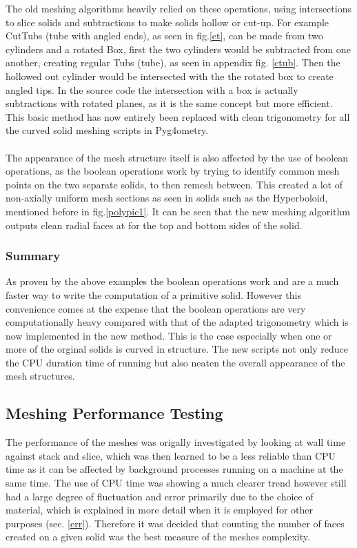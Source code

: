 \documentclass[12pt,a4paper]{article}
\begin{document}
\noindent The old meshing algorithms heavily relied on these operations, using intersections to slice solids and subtractions to make solids hollow or cut-up. For example CutTubs (tube with angled ends), as seen in fig.\ref{ct}, can be made from two cylinders and a rotated Box, first the two cylinders would be subtracted from one another, creating regular Tubs (tube), as seen in appendix fig. \ref{ctub}. Then the hollowed out cylinder would be intersected with the the rotated box to create angled tips. In the source code the intersection with a box is actually subtractions with rotated planes, as it is the same concept but more efficient. This basic method has now entirely been replaced with clean trigonometry for all the curved solid meshing scripts in Pyg4ometry.
\\\\
The appearance of the mesh structure itself is also affected by the use of boolean operations, as the boolean operations work by trying to identify common mesh points on the two separate solids, to then remesh between. This created a lot of non-axially uniform mesh sections as seen in solids such as the Hyperboloid, mentioned before in fig.\ref{polypic1}. It can be seen that the new meshing algorithm outputs clean radial faces at for the top and bottom sides of the solid.

\subsubsection{Summary}
As proven by the above examples the boolean operations work and are a much faster way to write the computation of a primitive solid. However this convenience comes at the expense that the boolean operations are very computationally heavy compared with that of the adapted trigonometry which is now implemented in the new method. This is the case especially when one or more of the orginal solids is curved in structure. The new scripts not only reduce the CPU duration time of running but also neaten the overall appearance of the mesh structures.

\subsection{Meshing Performance Testing}\label{per}
The performance of the meshes was origally investigated by looking at wall time against stack and slice, which was then learned to be a less reliable than CPU time as it can be affected by background processes running on a machine at the same time. The use of CPU time was showing a much clearer trend however still had a large degree of fluctuation and error primarily due to the choice of material, which is explained in more detail when it is employed for other purposes (sec. \ref{err}). Therefore it was decided that counting the number of faces created on a given solid was the best measure of the meshes complexity.
\end{document}
